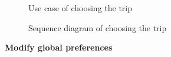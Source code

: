 \documentclass[12pt,titlepage]{article}
\begin{document}
\pagebreak 
\begin{figure}
\centering
{}
\caption{Use case of choosing the trip}

\end{figure}

\begin{figure}
\centering
{}
\caption{Sequence diagram of choosing the trip}

\end{figure}


\clearpage
\newpage
\begin{flushleft}
\textbf{Modify global preferences}
\end{flushleft}
\end{document}
